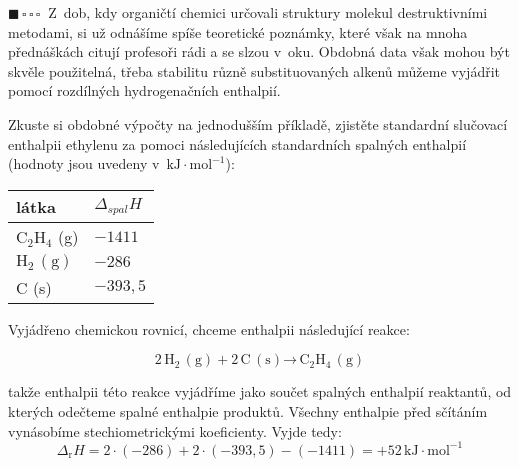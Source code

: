 \documentclass{book}
\newcommand{\jeden}{$\blacksquare \, \square \, \square \, \square \; \; $}
\renewenvironment{quotation}{\par}{\par} %
\begin{document}
\hrulefill %
\begin{quotation}
\jeden Z~dob, kdy organičtí chemici určovali struktury molekul destruktivními
metodami, si už odnášíme spíše teoretické poznámky, které však na
mnoha přednáškách citují profesoři rádi a se slzou v~oku. Obdobná
data však mohou být skvěle použitelná, třeba stabilitu různě substituovaných alkenů můžeme vyjádřit pomocí rozdílných hydrogenačních enthalpií.

Zkuste si obdobné výpočty na jednodušším příkladě, zjistěte standardní
slučovací enthalpii ethylenu za pomoci následujících standardních
spalných enthalpií (hodnoty jsou uvedeny v~$\mathrm{kJ\cdot mol^{-1}}$): 

\begin{center}
\begin{tabular}{l|l}
látka & $\Delta _{spal} H$   \\\hline
\hline
$\mathrm{C_{2}H_{4}}$ (g)  & $-1411$                          \\\hline
    $\mathrm{H_{2}\, (g)}$  &     $-286$                                 \\\hline
  C (s)    &          $-393,5$                           
\end{tabular}
\end{center}
\end{quotation} \dotfill \par 
Vyjádřeno chemickou rovnicí, chceme enthalpii následující reakce: 

\[
\mathrm{2\, H_{2}\, (g)+2\, C\, (s)\text{→}\,C_{2}H_{4}\,(g)}
\]

takže enthalpii této reakce vyjádříme jako součet spalných enthalpií
reaktantů, od kterých odečteme spalné enthalpie produktů. Všechny
enthalpie před sčítáním vynásobíme stechiometrickými koeficienty.
Vyjde tedy:
\[
\Delta _\mathrm{r} H=2\cdot (-286) + 2\cdot(- 393,5) - (-1411) = +52\, \mathrm{kJ\cdot mol^{-1}}
\]
\end{document}
